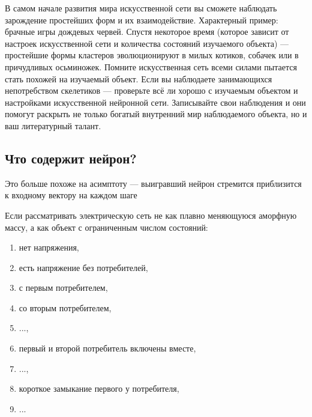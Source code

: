\documentclass[unicode, 12pt, a4paper,oneside,fleqn]{article}
\begin{document}
В самом начале развития мира искусственной сети вы сможете наблюдать
зарождение простейших форм и их взаимодействие. Характерный пример:
брачные игры дождевых червей. Спустя некоторое время (которое зависит
от настроек искусственной сети и количества состояний изучаемого
объекта) --- простейшие формы кластеров эволюционируют в милых
котиков, собачек или в причудливых осьминожек. Помните искусственная
сеть всеми силами пытается стать похожей на изучаемый объект. Если вы
наблюдаете занимающихся непотребством скелетиков --- проверьте всё ли
хорошо с изучаемым объектом и настройками искусственной нейронной
сети. Записывайте свои наблюдения и они помогут раскрыть не только
богатый внутренний мир наблюдаемого объекта, но и ваш литературный
талант.

\subsection{Что содержит нейрон?}

Это больше похоже на асимптоту --- выигравший нейрон стремится
приблизится к входному вектору на каждом шаге


Если рассматривать электрическую сеть не как плавно меняющуюся
аморфную массу, а как объект с ограниченным числом состояний:
\begin{enumerate}
\item нет напряжения,
\item есть напряжение без потребителей,
\item с первым потребителем,
\item со вторым потребителем,
\item ...,
\item первый и второй потребитель включены вместе,
\item ...,
\item короткое замыкание первого у потребителя,
\item ...
\end{enumerate}
\end{document}
